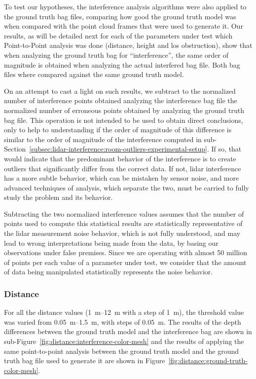 To test our hypotheses, the interference analysis algorithms were also applied to the ground truth bag files, comparing how good the ground truth model was when compared with the point cloud frames that were used to generate it. Our results, as will be detailed next for each of the parameters under test which Point-to-Point analysis was done (distance, height and \ac{los} obstruction), show that when analyzing the ground truth bag for ``interference'', the same order of magnitude is obtained when analyzing the actual interfered bag file. Both bag files where compared against the same ground truth model.

On an attempt to cast a light on such results, we subtract to the normalized number of interference points obtained analyzing the interference bag file the normalized number of erroneous points obtained by analyzing the ground truth bag file. This operation is not intended to be used to obtain direct conclusions, only to help to understanding if the order of magnitude of this difference is similar to the order of magnitude of the interference computed in sub-Section~\ref{subsec:lidar-interference:room-outliers-experimental-setup}. If so, that would indicate that the predominant behavior of the interference is to create outliers that significantly differ from the correct data. If not, \ac{lidar} interference has a more subtle behavior, which can be mistaken by sensor noise, and more advanced techniques of analysis, which separate the two, must be carried to fully study the problem and its behavior.

Subtracting the two normalized interference values assumes that the number of points used to compute this statistical results are statistically representative of the \ac{lidar} measurement noise behavior, which is not fully understood, and may lead to wrong interpretations being made from the data, by basing our observations under false premises. Since we are operating with almost 50 million of points per each value of a parameter under test, we consider that the amount of data being manipulated statistically represents the noise behavior.

\subsubsection{Distance}
For all the distance values (\SIrange{1}{12}{\meter} with a step of \SI{1}{\meter}), the threshold value was varied from \SIrange{0.05}{1.5}{\meter}, with steps of \SI{0.05}{\meter}. The results of the depth differences between the ground truth model and the interference bag are shown in sub-Figure~\ref{fig:distance:interference-color-mesh} and the results of applying the same point-to-point analysis between the ground truth model and the ground truth bag file used to generate it are shown in Figure~\ref{fig:distance:ground-truth-color-mesh}.

